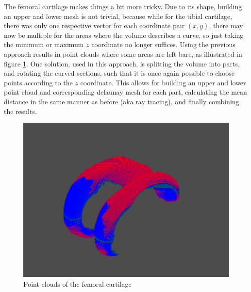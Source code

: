 \par
The femoral cartilage makes things a bit more tricky. Due to its shape, building an upper and lower mesh is not trivial, because while for the tibial cartilage, there was only one respective vector for each coordinate pair $(x, y)$, there may now be multiple for the areas where the volume describes a curve, so just taking the minimum or maximum $z$ coordinate no longer suffices. Using the previous approach results in point clouds where some areas are left bare, as illustrated in figure \ref{fig:femoral_point_cloud}. One solution, used in this approach, is splitting the volume into parts, and rotating the curved sections, such that it is once again possible to choose points according to the $z$ coordinate. This allows for building an upper and lower point cloud and corresponding delaunay mesh for each part, calculating the mean distance in the same manner as before (aka ray tracing), and finally combining the results.
\begin{figure}[htb!]
	\centering
	\includegraphics[width=\linewidth]{./figures/s4}
	\caption{Point clouds of the femoral cartilage}
	\label{fig:femoral_point_cloud}
\end{figure}

